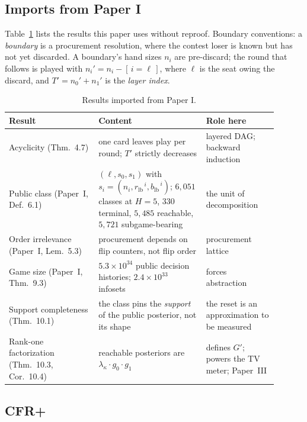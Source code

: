 \documentclass[11pt]{article}
\theoremstyle{plain}
\theoremstyle{definition}
\theoremstyle{remark}
\newcommand{\rlb}{\ensuremath{r_{\mathrm{lb}}}}
\newcommand{\blb}{\ensuremath{b_{\mathrm{lb}}}}
\newcommand{\gp}{\ensuremath{G'}}
\begin{document}
\subsection{Imports from Paper I}

Table~\ref{tab:imports} lists the results this paper uses without reproof.
Boundary conventions: a \emph{boundary} is a procurement resolution, where the
contest loser is known but has not yet discarded. A boundary's hand sizes $n_i$
are pre-discard; the round that follows is played with $n_i' = n_i -
[\,i=\ell\,]$, where $\ell$ is the seat owing the discard, and $T' = n_0' +
n_1'$ is the \emph{layer index}.

\begin{table}[htbp]
\centering
\caption{Results imported from Paper I.}
\label{tab:imports}
\small
\begin{tabular}{@{}>{\raggedright\arraybackslash}p{0.30\linewidth}>{\raggedright\arraybackslash}p{0.36\linewidth}>{\raggedright\arraybackslash}p{0.24\linewidth}@{}}
\toprule
Result & Content & Role here\\
\midrule
Acyclicity (Thm.~4.7) & one card leaves play per round; $T'$ strictly
  decreases & layered DAG; backward induction\\
Public class (Paper~I, Def.~6.1) & $(\ell,s_0,s_1)$ with
  $s_i=(n_i,\rlb^{\,i},\blb^{\,i})$; $6{,}051$ classes at $H=5$, $330$
  terminal, $5{,}485$ reachable, $5{,}721$ subgame-bearing & the unit of
  decomposition\\
Order irrelevance (Paper~I, Lem.~5.3) & procurement depends on flip
  counters, not flip order & procurement lattice\\
Game size (Paper~I, Thm.~9.3) & $5.3\times10^{34}$ public decision
  histories; $2.4\times10^{33}$ infosets & forces abstraction\\
Support completeness (Thm.~10.1) & the class pins the \emph{support} of
  the public posterior, not its shape & the reset is an approximation to
  be measured\\
Rank-one factorization (Thm.~10.3, Cor.~10.4) & reachable posteriors are
  $\lambda_\kappa\cdot g_0\cdot g_1$ & defines $\gp$; powers the TV
  meter; Paper~III\\
\bottomrule
\end{tabular}
\end{table}

\subsection{CFR+}\label{sec:cfr}
\end{document}
